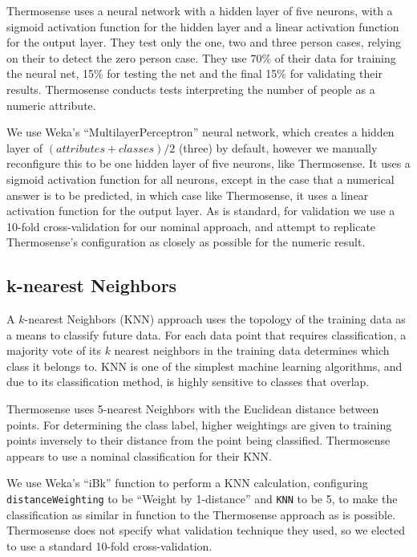 \documentclass[../thesis/thesis.tex]{subfiles}
\begin{document}
Thermosense uses a neural network with a hidden layer of five neurons, with a sigmoid activation function for the hidden layer and a linear activation function for the output layer. They test only the one, two and three person cases, relying on their \pir to detect the zero person case. They use 70\% of their data for training the neural net, 15\% for testing the net and the final 15\% for validating their results. Thermosense conducts tests interpreting the number of people as a numeric attribute.

We use Weka's ``MultilayerPerceptron'' neural network, which creates a hidden layer of $(\mathit{attributes} + \mathit{classes}) / 2$ (three) by default, however we manually reconfigure this to be one hidden layer of five neurons, like Thermosense. It uses a sigmoid activation function for all neurons, except in the case that a numerical answer is to be predicted, in which case like Thermosense, it uses a linear activation function for the output layer. As is standard, for validation we use a 10-fold cross-validation for our nominal approach, and attempt to replicate Thermosense's configuration as closely as possible for the numeric result. %

\subsection{k-nearest Neighbors}
A $k$-nearest Neighbors (KNN) approach uses the topology of the training data as a means to classify future data. For each data point that requires classification, a majority vote of its $k$ nearest neighbors in the training data determines which class it belongs to. KNN is one of the simplest machine learning algorithms, and due to its classification method, is highly sensitive to classes that overlap. 

Thermosense uses 5-nearest Neighbors with the Euclidean distance between points. For determining the class label, higher weightings are given to training points inversely to their distance from the point being classified. Thermosense appears to use a nominal classification for their KNN.

We use Weka's ``iBk'' function to perform a KNN calculation, configuring \texttt{distanceWeighting} to be ``Weight by 1-distance'' and \texttt{KNN} to be 5, to make the classification as similar in function to the Thermosense approach as is possible. Thermosense does not specify what validation technique they used, so we elected to use a standard 10-fold cross-validation.
\end{document}
